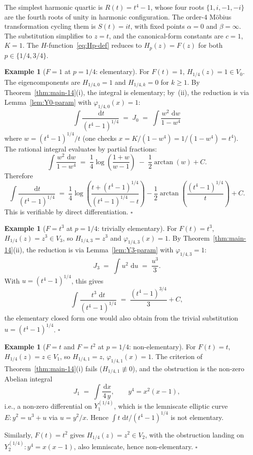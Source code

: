 \documentclass[11pt,a4paper]{article}
\theoremstyle{plain}
\theoremstyle{definition}
\newtheorem{example}[theorem]{Example}
\theoremstyle{remark}
\renewcommand{\d}{\,\mathrm{d}}
\begin{document}
The simplest harmonic quartic is $R(t) = t^4 - 1$, whose four roots $\{1, i, -1, -i\}$ are the fourth roots of unity in harmonic configuration. The order-$4$ Möbius transformation cycling them is $S(t) = it$, with fixed points $\alpha = 0$ and $\beta = \infty$. The substitution simplifies to $z = t$, and the canonical-form constants are $c = 1$, $K = 1$. The $H$-function~\eqref{eq:Hp-def} reduces to $H_p(z) = F(z)$ for both $p \in \{1/4, 3/4\}$.

\begin{example}[$F = 1$ at $p = 1/4$: elementary]\label{ex:F1-14}
For $F(t) = 1$, $H_{1/4}(z) = 1 \in V_0$. The eigencomponents are $H_{1/4, 0} = 1$ and $H_{1/4, k} = 0$ for $k \geq 1$. By Theorem~\ref{thm:main-14}(i), the integral is elementary; by~(ii), the reduction is via Lemma~\ref{lem:Y0-param} with $\varphi_{1/4, 0}(x) = 1$:
\[
  \int \frac{\d t}{(t^4 - 1)^{1/4}} \;=\; J_0 \;=\; \int \frac{w^2\,\d w}{1 - w^4}
\]
where $w = (t^4-1)^{1/4}/t$ (one checks $x = K/(1-w^4) = 1/(1-w^4) = t^4$). The rational integral evaluates by partial fractions:
\[
  \int \frac{w^2\,\d w}{1 - w^4} \;=\; \frac{1}{4}\log\!\left(\frac{1 + w}{w - 1}\right) \;-\; \frac{1}{2}\arctan(w) + C.
\]
Therefore
\[
  \int \frac{\d t}{(t^4 - 1)^{1/4}} \;=\; \frac{1}{4}\log\!\left(\frac{t + (t^4-1)^{1/4}}{(t^4-1)^{1/4} - t}\right) - \frac{1}{2}\arctan\!\left(\frac{(t^4-1)^{1/4}}{t}\right) + C.
\]
This is verifiable by direct differentiation. \hfill$\square$
\end{example}

\begin{example}[$F = t^3$ at $p = 1/4$: trivially elementary]\label{ex:Ft3-14}
For $F(t) = t^3$, $H_{1/4}(z) = z^3 \in V_3$, so $H_{1/4, 3} = z^3$ and $\varphi_{1/4, 3}(x) = 1$. By Theorem~\ref{thm:main-14}(ii), the reduction is via Lemma~\ref{lem:Y3-param} with $\varphi_{1/4, 3} = 1$:
\[
  J_3 \;=\; \int u^2\,\d u \;=\; \frac{u^3}{3}.
\]
With $u = (t^4 - 1)^{1/4}$, this gives
\[
  \int \frac{t^3\,\d t}{(t^4 - 1)^{1/4}} \;=\; \frac{(t^4 - 1)^{3/4}}{3} + C,
\]
the elementary closed form one would also obtain from the trivial substitution $u = (t^4 - 1)^{1/4}$. \hfill$\square$
\end{example}

\begin{example}[$F = t$ and $F = t^2$ at $p = 1/4$: non-elementary]\label{ex:Ft-Ft2-14}
For $F(t) = t$, $H_{1/4}(z) = z \in V_1$, so $H_{1/4, 1} = z$, $\varphi_{1/4, 1}(x) = 1$. The criterion of Theorem~\ref{thm:main-14}(i) fails ($H_{1/4, 1} \not\equiv 0$), and the obstruction is the non-zero Abelian integral
\[
  J_1 \;=\; \int \frac{\d x}{4 \, y}, \qquad y^4 = x^2(x-1),
\]
i.e., a non-zero differential on $Y_1^{(1/4)}$, which is the lemniscate elliptic curve $E\colon y^2 = u^3 + u$ via $u = y^2/x$. Hence $\int t\,\d t/(t^4-1)^{1/4}$ is not elementary.

Similarly, $F(t) = t^2$ gives $H_{1/4}(z) = z^2 \in V_2$, with the obstruction landing on $Y_2^{(1/4)}\colon y^4 = x(x-1)$, also lemniscate, hence non-elementary. \hfill$\square$
\end{example}
\end{document}
